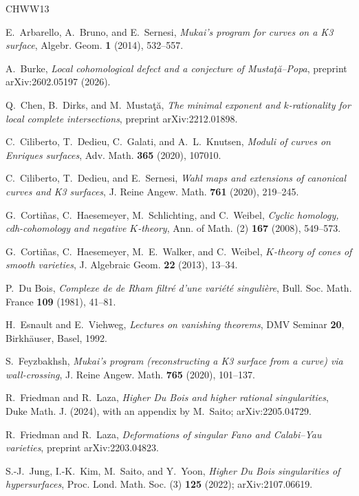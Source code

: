 \documentclass[11pt]{amsart}
\numberwithin{equation}{section}
\theoremstyle{plain}
\theoremstyle{definition}
\theoremstyle{remark}
\begin{document}
\begin{thebibliography}{CHWW13}

E.~Arbarello, A.~Bruno, and E.~Sernesi,
\emph{Mukai's program for curves on a K3 surface},
Algebr. Geom. \textbf{1} (2014), 532--557.

A.~Burke,
\emph{Local cohomological defect and a conjecture of Musta\c{t}\u{a}--Popa},
preprint arXiv:2602.05197 (2026).

Q.~Chen, B.~Dirks, and M.~Musta\c{t}\u{a},
\emph{The minimal exponent and $k$-rationality for local complete intersections},
preprint arXiv:2212.01898.

C.~Ciliberto, T.~Dedieu, C.~Galati, and A.~L.~Knutsen,
\emph{Moduli of curves on Enriques surfaces},
Adv. Math. \textbf{365} (2020), 107010.

C.~Ciliberto, T.~Dedieu, and E.~Sernesi,
\emph{Wahl maps and extensions of canonical curves and K3 surfaces},
J. Reine Angew. Math. \textbf{761} (2020), 219--245.

G.~Corti\~nas, C.~Haesemeyer, M.~Schlichting, and C.~Weibel,
\emph{Cyclic homology, cdh-cohomology and negative $K$-theory},
Ann. of Math. (2) \textbf{167} (2008), 549--573.

G.~Corti\~nas, C.~Haesemeyer, M.~E.~Walker, and C.~Weibel,
\emph{$K$-theory of cones of smooth varieties},
J. Algebraic Geom. \textbf{22} (2013), 13--34.

P.~Du Bois,
\emph{Complexe de de Rham filtr\'e d'une vari\'et\'e singuli\`ere},
Bull. Soc. Math. France \textbf{109} (1981), 41--81.

H.~Esnault and E.~Viehweg,
\emph{Lectures on vanishing theorems},
DMV Seminar \textbf{20}, Birkh\"auser, Basel, 1992.

S.~Feyzbakhsh,
\emph{Mukai's program (reconstructing a K3 surface from a curve) via wall-crossing},
J. Reine Angew. Math. \textbf{765} (2020), 101--137.

R.~Friedman and R.~Laza,
\emph{Higher Du Bois and higher rational singularities},
Duke Math. J. (2024), with an appendix by M.~Saito; arXiv:2205.04729.

R.~Friedman and R.~Laza,
\emph{Deformations of singular Fano and Calabi--Yau varieties},
preprint arXiv:2203.04823.

S.-J.~Jung, I.-K.~Kim, M.~Saito, and Y.~Yoon,
\emph{Higher Du Bois singularities of hypersurfaces},
Proc. Lond. Math. Soc. (3) \textbf{125} (2022); arXiv:2107.06619.


\end{thebibliography}
\end{document}
